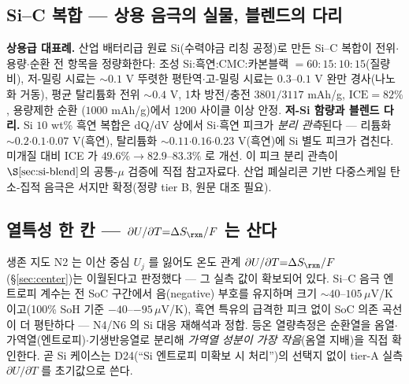 \subsection{Si--C 복합 --- 상용 음극의 실물, 블렌드의 다리}\label{ssec:si-sic}
\textbf{상용급 대표례.} 산업 배터리급 원료 Si(수력야금 리칭 공정)로 만든 Si--C 복합이 전위$\cdot$용량$\cdot$순환
전 항목을 정량화한다\cite{andersen_sic2019}: 조성 Si:흑연:CMC:카본블랙 $=60{:}15{:}10{:}15$(질량비),
저-밀링 시료는 $\sim0.1$ V 뚜렷한 평탄역$\cdot$고-밀링 시료는 $0.3$--$0.1$ V 완만 경사(나노화 거동),
평균 탈리튬화 전위 $\sim0.4$ V, 1차 방전/충전 $3801/3117$ mAh/g, $\mathrm{ICE}=82\%$, 용량제한 순환
($1000$ mAh/g)에서 $1200$ 사이클 이상 안정. \textbf{저-Si 함량과 블렌드 다리.} Si $10$ wt\% 흑연
복합은 dQ/dV 상에서 Si$\cdot$흑연 피크가 \emph{분리 관측}된다\cite{naboka_sic2021} --- 리튬화
$\sim0.2$$\cdot$$0.1$$\cdot$$0.07$ V(흑연), 탈리튬화 $\sim0.11$$\cdot$$0.16$$\cdot$$0.23$ V(흑연)에
Si 별도 피크가 겹친다. 미개질 대비 ICE 가 $49.6\%\to82.9$--$83.3\%$ 로 개선. 이 피크 분리 관측이
$\S\ref{sec:si-blend}$의 공통-$\mu$ 검증에 직접 참고자료다. 산업 폐실리콘 기반 다중스케일 탄소-집적
음극은 서지만 확정(정량 tier B, 원문 대조 필요)\cite{lee_sic2025}.

\subsection{열특성 한 칸 --- $\partial U/\partial T{=}\Delta S_\rxn/F$ 는 산다}\label{ssec:si-thermal}
생존 지도 N2 는 이산 중심 $U_j$ 를 잃어도 온도 관계 $\partial U/\partial T{=}\Delta S_\rxn/F$
(\S\ref{sec:center})는 이월된다고 판정했다 --- 그 실측 값이 확보되어 있다. Si--C 음극 엔트로피 계수는
전 SoC 구간에서 음(negative) 부호를 유지하며 크기 $\sim40$--$105\,\mu$V/K 이고(100\% SoH 기준
$-40$--$-95\,\mu$V/K), 흑연 특유의 급격한 피크 없이 SoC 의존 곡선이 더 평탄하다\cite{bohm_entropy2024}
--- N4/N6 의 Si 대응 재해석과 정합. 등온 열량측정은 순환열을 옴열$\cdot$가역열(엔트로피)$\cdot$기생반응열로
분리해 \emph{가역열 성분이 가장 작음}(옴열 지배)을 직접 확인한다\cite{arnot_calorimetry2021}. 곧 Si 케이스는
D24(``Si 엔트로피 미확보 시 처리'')의 선택지 없이 tier-A 실측 $\partial U/\partial T$ 를 초기값으로 쓴다.

